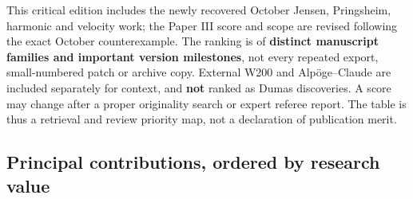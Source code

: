 \documentclass[
  10pt,
  a4paper,
  10pt,
  oneside,
  openany]{book}
\begin{document}
This critical edition includes the newly recovered October Jensen,
Pringsheim, harmonic and velocity work; the Paper III score and scope
are revised following the exact October counterexample. The ranking is
of \textbf{distinct manuscript families and important version
milestones}, not every repeated export, small-numbered patch or archive
copy. External W200 and Alpöge--Claude are included separately for
context, and \textbf{not} ranked as Dumas discoveries. A score may
change after a proper originality search or expert referee report. The
table is thus a retrieval and review priority map, not a declaration of
publication merit.

\subsection{Principal contributions, ordered by research
value}\label{principal-contributions-ordered-by-research-value}
\end{document}
